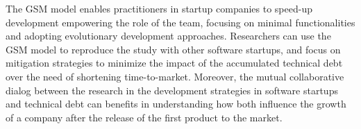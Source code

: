 \documentclass[10pt,journal,letterpaper,compsoc]{IEEEtran}
\begin{document}
The GSM model enables practitioners in startup companies to speed-up development empowering the role of the team, focusing on minimal functionalities and adopting evolutionary development approaches. Researchers can use the GSM model to reproduce the study with other software startups, and focus on mitigation strategies to minimize the impact of the accumulated technical debt over the need of shortening time-to-market. Moreover, the  mutual collaborative dialog between the research in the development strategies in software startups and technical debt can benefits in understanding how both influence the growth of a company after the release of the first product to the market.





%
%


\end{document}
